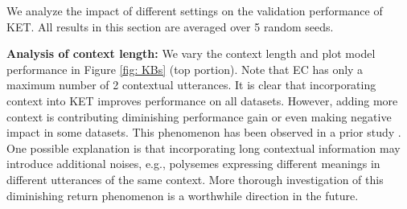 \documentclass[11pt,a4paper]{article}
\begin{document}
We analyze the impact of different settings on the validation performance of KET. All results in this section are averaged over 5 random seeds.

\noindent\textbf{Analysis of context length:} 
We vary the context length  and plot model performance in Figure \ref{fig: KBs} (top portion). Note that EC has only a maximum number of 2 contextual utterances. It is clear that incorporating context into KET improves performance on all datasets. However, adding more context is contributing diminishing performance gain or even making negative impact in some datasets. This phenomenon has been observed in a prior study \cite{su2018time}. One possible explanation is that incorporating long contextual information may introduce additional noises, e.g., polysemes expressing different meanings in different utterances of the same context. More thorough investigation of this diminishing return phenomenon is a worthwhile direction in the future.
\end{document}
